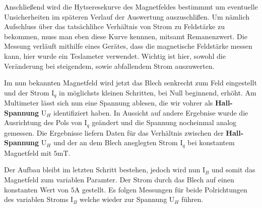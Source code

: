 Anschließend wird die Hytseresekurve %
des Magnetfeldes bestimmmt um eventuelle Unsicherheiten im späteren Verlauf der Auswertung auszuschlißen. Um nämlich Aufschluss über das 
tatsächlihce Verhältnis von Strom zu Feldstärke zu bekommen, muss man eben diese Kurve kennnen, mitsamt  Remanenzwert. %
Die Messung verläuft mithilfe eines Gerätes, dass die magnetische Feldstärke messen kann, hier wurde ein Teslameter verwendet.   
Wichtig ist hier, sowohl die Veränderung bei steigendem, sowie abfallendem Strom auszuwerten.  \\ \flushleft

Im nun bekannten Magnetfeld wird jetzt das Blech senkrecht zum Feld eingestellt und der Strom $\text{I}_q$ in möglichsts kleinen Schritten, bei Null beginnend, erhöht. 
Am Multimeter lässt sich nun eine Spannung ablesen, die wir vohrer als \textbf{Hall-Spannung} $\text{U}_H$  identifiziert haben. In Aussicht auf andere Ergebnise 
wurde die Ausrichtung des Pols von $\text{I}_q$ geändert und die Spannung nocheinmal analog gemessen. Die Ergebnisse liefern Daten für das Verhältnis zwischen 
der \textbf{Hall-Spannung} $\text{U}_H$ und der an dem Blech aneglegten Strom $\text{I}_q$ bei konstantem Magnetfeld mit $5$m$\si{\tesla}$.\\ \flushleft

Der Aufbau bleibt im letzten Schritt bestehen, jedoch wird nun $\text{I}_B$ und somit das Magnetfeld zum variablen Paramter. Der Strom durch das Blech auf einen 
konstanten Wert von $5\si{\ampere}$ gestellt. Es folgen Messungen für beide Polrichtungen des variablen Stroms $\text{I}_B$ welche wieder zur Spannung $\text{U}_H$ führen.
                                                                                                                    
                                                      